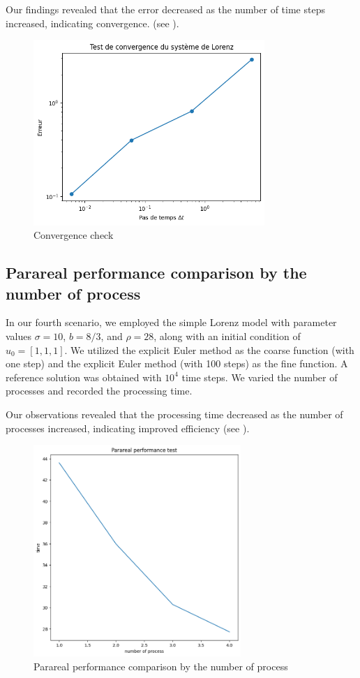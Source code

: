 \documentclass[a4paper,12pt,french]{article}
\begin{document}
Our findings revealed that the error decreased as the number of time steps increased, indicating convergence. (see ).
\begin{figure}[ht!]
    \centering
    \includegraphics[width=0.78\textwidth]{img/cv.png}
    \caption{Convergence check}
    \label{fig:5}
\end{figure}
\newpage
\subsection{Parareal performance comparison by the number of process}
In our fourth scenario, we employed the simple Lorenz model with parameter values \(\sigma = 10\), \(b = 8/3\), and \(\rho = 28\), along with an initial condition of \(u_0=[1, 1, 1]\). We utilized the explicit Euler method as the coarse function (with one step) and the explicit Euler method (with 100 steps) as the fine function. A reference solution was obtained with \(10^4\) time steps. We varied the number of processes and recorded the processing time.

Our observations revealed that the processing time decreased as the number of processes increased, indicating improved efficiency (see ).
\begin{figure}[ht!]
    \centering
    \includegraphics[width=0.7\textwidth]{img/par.png}
    \caption{Parareal performance comparison by the number of process}
    \label{fig:6}
\end{figure}
\end{document}
